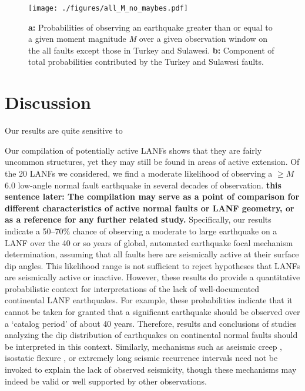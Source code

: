 \documentclass[twocolumn,grl]{AGUTeX}
\begin{document}
\begin{article}
\begin{figure}%
\noindent\texttt{[image: ./figures/all\_M\_no\_maybes.pdf]}
\caption{\textbf{a:} Probabilities of observing an earthquake greater than or equal to a given moment magnitude \emph{M} over a given observation window on the all faults except those in Turkey and Sulawesi. \textbf{b:} Component of total probabilities contributed by the Turkey and Sulawesi faults.}
\label{fig:all_probs_no_maybes}
\end{figure}


\section{Discussion}
Our results are quite sensitive to 

Our compilation of potentially active LANFs shows that they are fairly
uncommon structures, yet they may still be found in areas of active
extension. Of the 20 LANFs we considered, we find a moderate
likelihood of observing a $\ge M$6.0 low-angle normal fault earthquake
in several decades of observation.  {\bf this sentence later: The
  compilation may serve as a point of comparison for different
  characteristics of active normal faults or LANF geometry, or as a
  reference for any further related study.} Specifically, our results
indicate a 50--70\% chance of observing a moderate to large earthquake
on a LANF over the 40 or so years of global, automated earthquake
focal mechanism determination, assuming that all faults here are
seismically active at their surface dip angles.  This likelihood range
is not sufficient to reject hypotheses that LANFs are seismically
active or inactive. However, these results do provide a quantitative
probabilistic context for interpretations of the lack of
well-documented continental LANF earthquakes.  For example, these
probabilities indicate that it cannot be taken for granted that a
significant earthquake should be observed over a `catalog period' of
about 40 years. Therefore, results and conclusions of studies
analyzing the dip distribution of earthquakes on continental normal
faults \citep{jackson1987, collettinisibson2001} should be interpreted
in this context.  Similarly, mechanisms such as aseismic creep \citep
[e.g.,][]{collettini2011lanfmech, hreinsdottir2009altotib}, isostatic
flexure \citep[e.g.,][] {wernickeaxen1988rolling}, or extremely long
seismic recurrence intervals \citep{wernicke1995seis} need not be
invoked to explain the lack of observed seismicity, though these
mechanisms may indeed be valid or well supported by other
observations.


\end{article}
\end{document}
